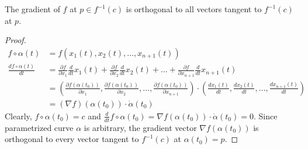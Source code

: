 \begin{lemma}
	The gradient of $f$ at $p \in f^{-1}(c)$ is orthogonal to all vectors tangent to $f^{-1}(c)$ at $p$.
\end{lemma}
\begin{proof}
\begin{align*}
	f \circ \alpha(t) & = f(x_1(t),x_2(t),\dots,x_{n+1}(t))\\
	\frac{d f \circ \alpha(t)}{dt}
	& = \frac{\partial f}{\partial x_1} \frac{d}{dt}x_1(t) + \frac{\partial f}{\partial x_2} \frac{d}{dt}x_2(t)+\dots + \frac{\partial f}{\partial x_{n+1}} \frac{d}{dt}x_{n+1}(t) \\
	& = \left( \frac{\partial f(\alpha(t_0))}{\partial x_1},\frac{\partial f(\alpha(t_0))}{\partial x_2},\dots,\frac{\partial f(\alpha(t_0))}{\partial x_{n+1}} \right) \cdot \left( \frac{dx_1(t)}{dt} , \frac{dx_2(t)}{dt} ,\dots,\frac{dx_{n+1}(t)}{dt} \right) \\
	& = (\nabla f)(\alpha(t_0)) \cdot \dot\alpha(t_0)
\end{align*}
	Clearly, $f \circ \alpha(t_0) = c$ and $\frac{d}{dt} f \circ \alpha(t_0) = \nabla f(\alpha(t_0)) \cdot \dot\alpha(t_0) = 0$.
	Since parametrized curve $\alpha$ is arbitrary, the gradient vector $\nabla f(\alpha(t_0))$ is orthogonal to every vector tangent to $f^{-1}(c)$ at $\alpha(t_0)=p$.
\end{proof}


